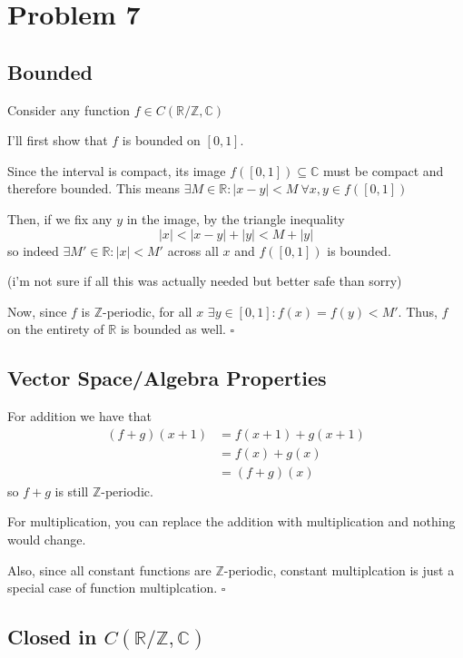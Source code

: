 \documentclass[12pt]{article}
\newcommand{\R}{\mathbb{R}}
\newcommand{\Z}{\mathbb{Z}}
\newcommand{\C}{\mathbb{C}}
\begin{document}
\pagebreak

\section{Problem 7}

\subsection{Bounded}

Consider any function $f \in C(\R/\Z, \C)$

I'll first show that $f$ is bounded on $[0, 1]$.

Since the interval is compact, its image $f([0, 1]) \subseteq \C$ must be compact and therefore bounded.
This means $\exists M \in \R: |x-y| < M\ \forall x, y \in f([0, 1])$

Then, if we fix any $y$ in the image, by the triangle inequality
\[|x| < |x-y| + |y| < M + |y|\]
so indeed $\exists M' \in \R: |x| < M'$ across all $x$ and $f([0, 1])$ is bounded.

(i'm not sure if all this was actually needed but better safe than sorry)

Now, since $f$ is $\Z$-periodic, for all $x$ $\exists y \in [0, 1]: f(x)=f(y) < M'$.
Thus, $f$ on the entirety of $\R$ is bounded as well. $\square$

\subsection{Vector Space/Algebra Properties}

For addition we have that
\begin{align*}
  (f+g)(x+1)
   & = f(x+1)+g(x+1) \\
   & = f(x)+g(x)     \\
   & = (f+g)(x)
\end{align*}
so $f+g$ is still $\Z$-periodic.

For multiplication, you can replace the addition with multiplication
and nothing would change.

Also, since all constant functions are $\Z$-periodic,
constant multiplcation is just a special case of function multiplcation. $\square$

\subsection{Closed in \texorpdfstring{$C(\R/\Z, \C)$}{C(R, C)}}
\end{document}
